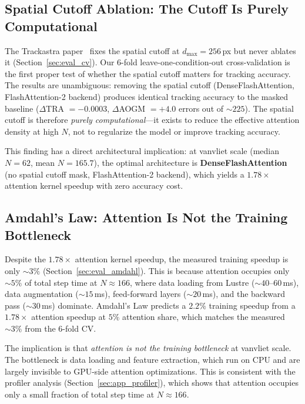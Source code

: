 \subsection{Spatial Cutoff Ablation: The Cutoff Is Purely Computational}

The Trackastra paper~\cite{gallusser2024trackastra} fixes the spatial cutoff at $d_{\max} = 256$\,px but never ablates it (Section~\ref{sec:eval_cv}). Our 6-fold leave-one-condition-out cross-validation is the first proper test of whether the spatial cutoff matters for tracking accuracy. The results are unambiguous: removing the spatial cutoff (DenseFlashAttention, FlashAttention-2 backend) produces identical tracking accuracy to the masked baseline ($\Delta$TRA $= -0.0003$, $\Delta$AOGM $= +4.0$ errors out of $\sim 225$). The spatial cutoff is therefore \emph{purely computational}---it exists to reduce the effective attention density at high $N$, not to regularize the model or improve tracking accuracy.

This finding has a direct architectural implication: at vanvliet scale (median $N = 62$, mean $N = 165.7$), the optimal architecture is \textbf{DenseFlashAttention} (no spatial cutoff mask, FlashAttention-2 backend), which yields a $1.78\times$ attention kernel speedup with zero accuracy cost.

\subsection{Amdahl's Law: Attention Is Not the Training Bottleneck}

Despite the $1.78\times$ attention kernel speedup, the measured training speedup is only $\sim 3\%$ (Section~\ref{sec:eval_amdahl}). This is because attention occupies only $\sim 5\%$ of total step time at $N \approx 166$, where data loading from Lustre ($\sim 40$--$60$\,ms), data augmentation ($\sim 15$\,ms), feed-forward layers ($\sim 20$\,ms), and the backward pass ($\sim 30$\,ms) dominate. Amdahl's Law predicts a $2.2\%$ training speedup from a $1.78\times$ attention speedup at $5\%$ attention share, which matches the measured $\sim 3\%$ from the 6-fold CV.

The implication is that \emph{attention is not the training bottleneck} at vanvliet scale. The bottleneck is data loading and feature extraction, which run on CPU and are largely invisible to GPU-side attention optimizations. This is consistent with the profiler analysis (Section~\ref{sec:app_profiler}), which shows that attention occupies only a small fraction of total step time at $N \approx 166$.


